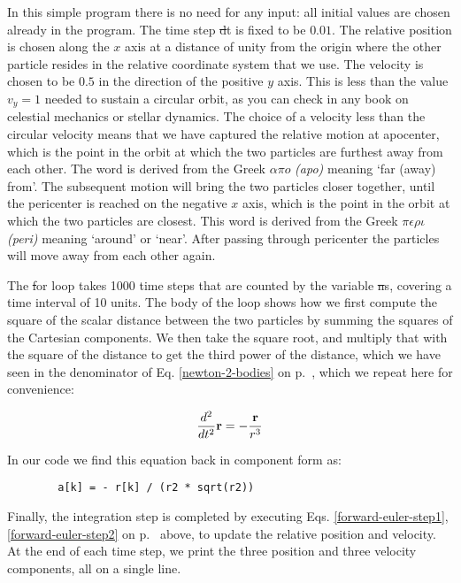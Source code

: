 In this simple program there is no need for any input: all initial
values are chosen already in the program.  The time step {\st dt} is
fixed to be $0.01$.  The relative position is chosen along the $x$
axis at a distance of unity from the origin where the other particle
resides in the relative coordinate system that we use.  The velocity
is chosen to be $0.5$ in the direction of the positive $y$ axis.  This
is less than the value $v_y = 1$ needed to sustain a circular orbit,
as you can check in any book on celestial mechanics or stellar
dynamics.  The choice of a velocity less than the circular velocity
means that we have captured the relative motion at apocenter, which is
the point in the orbit at which the two particles are furthest away
from each other.  The word is derived from the Greek $\alpha \pi o$
{\it (apo)} meaning `far (away) from'.  The subsequent motion will
bring the two particles closer together, until the pericenter is
reached on the negative $x$ axis, which is the point in the orbit at
which the two particles are closest.  This word is derived from the
Greek $\pi \epsilon \rho \iota$ {\it (peri)} meaning `around' or
`near'.  After passing through pericenter the particles will move away
from each other again.

The {\st for} loop takes 1000 time steps that are counted by the
variable {\st ns}, covering a time interval of 10 units.  The body of
the loop shows how we first compute the square of the scalar distance
between the two particles by summing the squares of the Cartesian
components.  We then take the square root, and multiply that with the
square of the distance to get the third power of the distance, which
we have seen in the denominator of Eq. \ref{newton-2-bodies} on
p.~\pageref{newton-2-bodies}, which we repeat here for convenience:

\begin{equation}
\frac{d^2}{dt^2}{\bf r} = - \frac{{\bf r}}{r^3}
\end{equation}

\noindent
In our code we find this equation back in component form as:

\begin{small}
\begin{verbatim}
        a[k] = - r[k] / (r2 * sqrt(r2))
\end{verbatim}
\end{small}

Finally, the integration step is completed by executing
Eqs. \ref{forward-euler-step1}, \ref{forward-euler-step2} on
p.~\pageref{forward-euler-step1} above, to update the relative
position and velocity.  At the end of each time step, we print the
three position and three velocity components, all on a single line.

